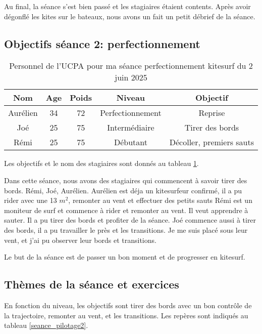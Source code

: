\documentclass[11pt,a4paper]{report}
\begin{document}
Au final, la séance s'est bien passé et les stagiaires étaient contents.
Après avoir dégonflé les kites sur le bateaux, nous avons un fait un
petit débrief de la séance.
\subsection{Objectifs séance 2: perfectionnement}

\begin{table}[h]
\centering
\begin{tabular}{|c|c|c|c|c|}
        \hline
        \textbf{Nom} & \textbf{Age} & \textbf{Poids}& \textbf{Niveau}     &  \textbf{Objectif} \\ 
        \hline
        Aurélien      &  34          &  72           &   Perfectionnement  & Reprise \\
        Joé           &  25          &  75           &   Intermédiaire     & Tirer des bords \\
        Rémi          &  25          & 75            &  Débutant           &  Décoller, premiers sauts  \\
        \hline
\end{tabular}
\caption{Personnel de l'UCPA pour ma séance perfectionnement kitesurf du 2 juin 2025\label{stagiaires_perf}}
\end{table}
Les objectifs et le nom des stagiaires sont donnés au tableau \ref{stagiaires_perf}.

Dans cette séance, nous avons des stagiaires qui commencent à savoir tirer des bords. Rémi, Joé, Aurélien. 
Aurélien est déja un kitesurfeur confirmé, il a pu rider avec une 13 $m^2$, 
remonter au vent et effectuer des petits sauts
Rémi est un moniteur de surf et commence à rider et remonter au vent. Il veut apprendre à sauter.
Il a pu tirer des bords et profiter de la séance.
Joé commence aussi à tirer des bords, il a pu travailler le près et les transitions.
Je me suis placé  sous leur vent, et j'ai pu observer leur bords et transitions.

Le but de la séance est de passer un bon moment et de progresser en kitesurf.
\subsection{Thèmes de la séance et exercices}
En fonction du niveau, les objectifs sont tirer des bords avec un bon contrôle de la 
trajectoire, remonter au vent, et les transitions. Les repères sont indiqués
au tableau \ref{seance_pilotage2}.
\end{document}
